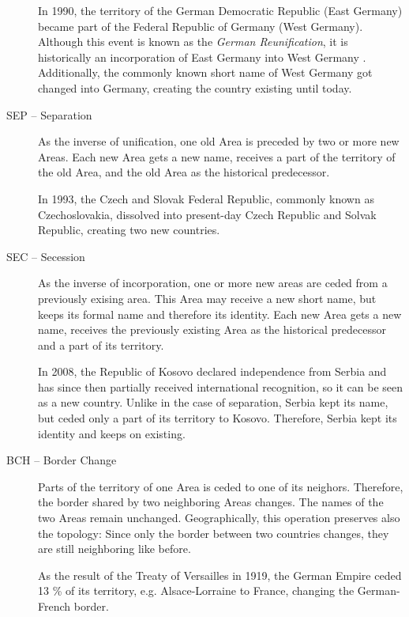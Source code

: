 \begin{description}
  \begin{footnotesize}
    In 1990, the territory of the German Democratic Republic (East Germany) became part of the Federal Republic of Germany (West Germany). Although this event is known as the \emph{German Reunification}, it is historically an incorporation of East Germany into West Germany \cite{incorporationEastWestGermany}. Additionally, the commonly known short name of West Germany got changed into Germany, creating the country existing until today.
  \end{footnotesize}
  \item[SEP -- Separation]
  As the inverse of unification, one old Area is preceded by two or more new Areas. Each new Area gets a new name, receives a part of the territory of the old Area, and the old Area as the historical predecessor. \\
  \begin{footnotesize}
    In 1993, the Czech and Slovak Federal Republic, commonly known as Czechoslovakia, dissolved into present-day Czech Republic and Solvak Republic, creating two new countries.
  \end{footnotesize}
  \item[SEC -- Secession]
  As the inverse of incorporation, one or more new areas are ceded from a previously exising area. This Area may receive a new short name, but keeps its formal name and therefore its identity. Each new Area gets a new name, receives the previously existing Area as the historical predecessor and a part of its territory. \\
  \begin{footnotesize}
    In 2008, the Republic of Kosovo declared independence from Serbia and has since then partially received international recognition, so it can be seen as a new country. Unlike in the case of separation, Serbia kept its name, but ceded only a part of its territory to Kosovo. Therefore, Serbia kept its identity and keeps on existing.
  \end{footnotesize}
  \item[BCH -- Border Change]
  Parts of the territory of one Area is ceded to one of its neighors. Therefore, the border shared by two neighboring Areas changes. The names of the two Areas remain unchanged. Geographically, this operation preserves also the topology: Since only the border between two countries changes, they are still neighboring like before. \\
  \begin{footnotesize}
    As the result of the Treaty of Versailles in 1919, the German Empire ceded 13 \% of its territory, e.g. Alsace-Lorraine to France, changing the German-French border.

\end{footnotesize}
\end{description}
